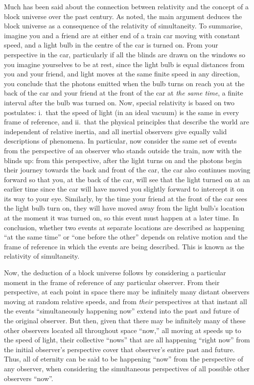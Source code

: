 \documentclass[aps,rmp,groupedaddress,twocolumn,10pt]{revtex4-2}
\begin{document}
Much has been said about the connection between relativity and the concept of a block universe over the past century. As \citet{Einstein1938} noted, the main argument deduces the block universe as a consequence of the relativity of simultaneity. To summarise, imagine you and a friend are at either end of a train car moving with constant speed, and a light bulb in the centre of the car is turned on. From your perspective in the car, particularly if all the blinds are drawn on the windows so you imagine yourselves to be at rest, since the light bulb is equal distances from you and your friend, and light moves at the same finite speed in any direction, you conclude that the photons emitted when the bulb turns on reach you at the back of the car and your friend at the front of the car at \textit{the same time}, a finite interval after the bulb was turned on. Now, special relativity is based on two postulates: i.~that the speed of light (in an ideal vacuum) is the same in every frame of reference, and ii.~that the physical principles that describe the world are independent of relative inertia, and all inertial observers give equally valid descriptions of phenomena. In particular, now consider the same set of events from the perspective of an observer who stands outside the train, now with the blinds up: from this perspective, after the light turns on and the photons begin their journey towards the back and front of the car, the car also continues moving forward so that you, at the back of the car, will see that the light turned on at an earlier time since the car will have moved you slightly forward to intercept it on its way to your eye. Similarly, by the time your friend at the front of the car sees the light bulb turn on, they will have moved away from the light bulb's location at the moment it was turned on, so this event must happen at a later time. In conclusion, whether two events at separate locations are described as happening ``at the same time'' or ``one before the other'' depends on relative motion and the frame of reference in which the events are being described. This is known as the relativity of simultaneity.

Now, the deduction of a block universe follows by considering a particular moment in the frame of reference of any particular observer. From their perspective, at each point in space there may be infinitely many distant observers moving at random relative speeds, and from \textit{their} perspectives at that instant all the events ``simultaneously happening now'' extend into the past and future of the original observer. But then, given that there may be infinitely many of these other observers located all throughout space ``now,'' all moving at speeds up to the speed of light, their collective ``nows'' that are all happening ``right now'' from the initial observer's perspective cover that observer's entire past and future. Thus, all of eternity can be said to be happening ``now'' from the perspective of any observer, when considering the simultaneous perspectives of all possible other observers ``now''.
\end{document}

